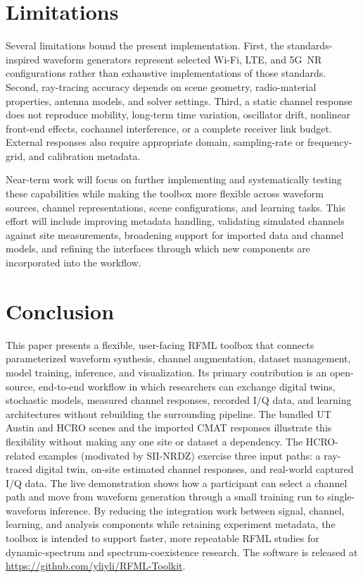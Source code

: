 \documentclass[10pt,conference,letterpaper]{IEEEtran}
\begin{document}
\section{Limitations}
\label{sec:limitations}

Several limitations bound the present implementation. First, the standards-inspired waveform generators represent selected Wi-Fi, LTE, and 5G~NR configurations rather than exhaustive implementations of those standards. Second, ray-tracing accuracy depends on scene geometry, radio-material properties, antenna models, and solver settings. Third, a static channel response does not reproduce mobility, long-term time variation, oscillator drift, nonlinear front-end effects, cochannel interference, or a complete receiver link budget. External responses also require appropriate domain, sampling-rate or frequency-grid, and calibration metadata.

Near-term work will focus on further implementing and systematically testing these capabilities while making the toolbox more flexible across waveform sources, channel representations, scene configurations, and learning tasks. This effort will include improving metadata handling, validating simulated channels against site measurements, broadening support for imported data and channel models, and refining the interfaces through which new components are incorporated into the workflow.

\section{Conclusion}
\label{sec:conclusion}

This paper presents a flexible, user-facing RFML toolbox that connects parameterized waveform synthesis, channel augmentation, dataset management, model training, inference, and visualization. Its primary contribution is an open-source, end-to-end workflow in which researchers can exchange digital twins, stochastic models, measured channel responses, recorded I/Q data, and learning architectures without rebuilding the surrounding pipeline. The bundled UT Austin and HCRO scenes and the imported CMAT responses illustrate this flexibility without making any one site or dataset a dependency. The HCRO-related examples (modivated by SII-NRDZ) exercise three input paths: a ray-traced digital twin, on-site estimated channel responses, and real-world captured I/Q data. The live demonstration shows how a participant can select a channel path and move from waveform generation through a small training run to single-waveform inference. By reducing the integration work between signal, channel, learning, and analysis components while retaining experiment metadata, the toolbox is intended to support faster, more repeatable RFML studies for dynamic-spectrum and spectrum-coexistence research. The software is released at \url{https://github.com/yliyli/RFML-Toolkit}.
\end{document}
